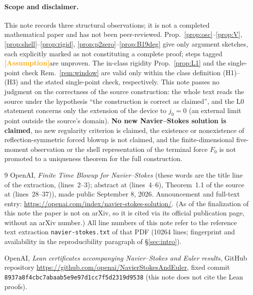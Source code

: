 \documentclass[11pt,a4paper]{article}
\theoremstyle{definition}
\theoremstyle{remark}
\newcommand{\lnos}[1]{(lines~#1)}
\newcommand{\HYP}{\textcolor{orange}{\textbf{[Assumption]}}}
\begin{document}
\paragraph{Scope and disclaimer.}
This note records three structural observations; it is not a completed mathematical paper and has not
been peer-reviewed.
Prop.~\ref{prop:osc}--\ref{prop:V}, \ref{prop:shell}--\ref{prop:rigid},
\ref{prop:p2zero}--\ref{prop:B19deg} give only argument sketches, each explicitly marked as not
constituting a complete proof; steps tagged \HYP are unproven.
The in-class rigidity Prop.~\ref{prop:L1} and the single-point check Rem.~\ref{rem:window} are valid only
within the class definition (H1)--(H3) and the stated single-point check, respectively.
This note passes no judgment on the correctness of the source construction: the whole text reads the
source under the hypothesis ``the construction is correct as claimed'', and the L0 statement concerns
only the extension of the device to $j_0=0$ (an external limit point outside the source's domain).
\textbf{No new Navier--Stokes solution is claimed}, no new regularity criterion is claimed, the existence
or nonexistence of reflection-symmetric forced blowup is not claimed, and the finite-dimensional
five-moment observation or the shell representation of the terminal force $F_0$ is not promoted to a
uniqueness theorem for the full construction.

\begin{thebibliography}{9}
OpenAI,
\textit{Finite Time Blowup for Navier--Stokes}
(these words are the title line of the extraction, \lnos{2--3}; abstract at \lnos{4--6},
Theorem~1.1 of the source at \lnos{28--37}),
made public September 8, 2026.
Announcement and full-text entry: \mbox{\url{https://openai.com/index/navier-stokes-solution/}}.
(As of the finalization of this note the paper is not on arXiv, so it is cited via its official
publication page, without an arXiv number.)
All line numbers of this note refer to the reference text extraction \texttt{navier-stokes.txt} of that
PDF (10264 lines; fingerprint and availability in the reproducibility paragraph of \S\ref{sec:intro}).

OpenAI,
\textit{Lean certificates accompanying Navier--Stokes and Euler results},
GitHub repository \mbox{\url{https://github.com/openai/NavierStokesAndEuler}},
fixed commit \texttt{8937a8f4cbc7abaab5e9e97d1cc7f5d2319d9538}
(this note does not cite the Lean proofs).
\end{thebibliography}
\end{document}
